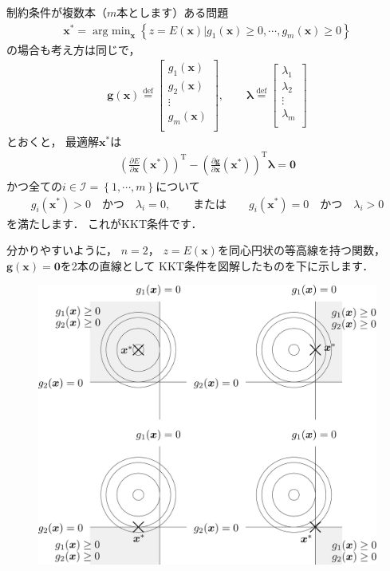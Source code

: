 ﻿\documentclass{jsarticle}
\begin{document}
制約条件が複数本（$m$本とします）ある問題
\begin{align*}
\boldsymbol{x}^{*}=\mathop{\mathrm{arg~min}}_{\boldsymbol{x}}\left\{
\left.
z=E(\boldsymbol{x})
\right|
g_{1}(\boldsymbol{x})\geq 0, \cdots, g_{m}(\boldsymbol{x})\geq 0
\right\}
\end{align*}
の場合も考え方は同じで，
\begin{align*}
\boldsymbol{g}(\boldsymbol{x})\overset{\mathrm{def}}{=}\left[\begin{array}{c}
g_{1}(\boldsymbol{x}) \\
g_{2}(\boldsymbol{x}) \\
\vdots \\
g_{m}(\boldsymbol{x}) \\
\end{array}\right]
,\qquad
\boldsymbol{\lambda}\overset{\mathrm{def}}{=}\left[\begin{array}{c}
\lambda_{1} \\
\lambda_{2} \\
\vdots \\
\lambda_{m} \\
\end{array}\right]
\end{align*}
とおくと，
最適解$\boldsymbol{x}^{*}$は
\begin{align*}
\left(\frac{\partial E}{\partial\boldsymbol{x}}(\boldsymbol{x}^{*})\right)^{\mathrm{T}}
-
\left(\frac{\partial\boldsymbol{g}}{\partial\boldsymbol{x}}(\boldsymbol{x}^{*})\right)^{\mathrm{T}}
\boldsymbol{\lambda}
=\boldsymbol{0}
\end{align*}
かつ全ての$i\in\mathcal{I}=\left\{1,\cdots,m\right\}$について
\begin{align*}
g_{i}(\boldsymbol{x}^{*})>0 \quad\mbox{かつ}\quad \lambda_{i}=0,
\qquad\mbox{または}\qquad
g_{i}(\boldsymbol{x}^{*})=0 \quad\mbox{かつ}\quad \lambda_{i}>0
\end{align*}
を満たします．
これがKKT条件です．

分かりやすいように，
$n=2$，
$z=E(\boldsymbol{x})$を同心円状の等高線を持つ関数，
$\boldsymbol{g}(\boldsymbol{x})=\boldsymbol{0}$を2本の直線として
KKT条件を図解したものを下に示します．
\begin{figure}[h]
\begin{center}
\includegraphics[width=.5\textwidth]{fig/Kuhn-Tucker-2.eps}
\end{center}
\end{figure}
\end{document}
